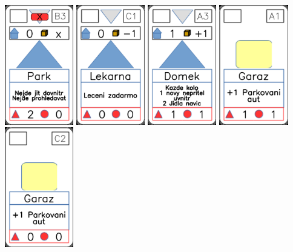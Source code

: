 \documentclass[a4paper]{article}
\begin{document}
	\includegraphics[width=3.0cm]{img-3_22}
	\includegraphics[width=3.0cm]{img-3_10}
	\includegraphics[width=3.0cm]{img-3_2}
	\includegraphics[width=3.0cm]{img-2_15}
	\includegraphics[width=3.0cm]{img-2_11}
\end{document}
